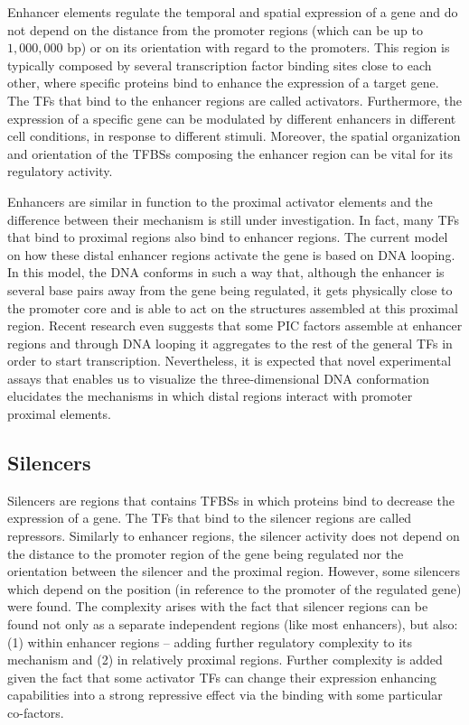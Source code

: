 Enhancer elements regulate the temporal and spatial expression of a gene and do not depend on the distance from the promoter regions (which can be up to \approxy$1,000,000$ bp) or on its orientation with regard to the promoters. This region is typically composed by several transcription factor binding sites close to each other, where specific proteins bind to enhance the expression of a target gene. The TFs that bind to the enhancer regions are called activators. Furthermore, the expression of a specific gene can be modulated by different enhancers in different cell conditions, in response to different stimuli. Moreover, the spatial organization and orientation of the TFBSs composing the enhancer region can be vital for its regulatory activity.

Enhancers are similar in function to the proximal activator elements and the difference between their mechanism is still under investigation. In fact, many TFs that bind to proximal regions also bind to enhancer regions. The current model on how these distal enhancer regions activate the gene is based on DNA looping. In this model, the DNA conforms in such a way that, although the enhancer is several base pairs away from the gene being regulated, it gets physically close to the promoter core and is able to act on the structures assembled at this proximal region. Recent research even suggests that some PIC factors assemble at enhancer regions and through DNA looping it aggregates to the rest of the general TFs in order to start transcription. Nevertheless, it is expected that novel experimental assays that enables us to visualize the three-dimensional DNA conformation elucidates the mechanisms in which distal regions interact with promoter proximal elements.

\subsection{Silencers}
\label{sec:silencers}

Silencers are regions that contains TFBSs in which proteins bind to decrease the expression of a gene. The TFs that bind to the silencer regions are called repressors. Similarly to enhancer regions, the silencer activity does not depend on the distance to the promoter region of the gene being regulated nor the orientation between the silencer and the proximal region. However, some silencers which depend on the position (in reference to the promoter of the regulated gene) were found. The complexity arises with the fact that silencer regions can be found not only as a separate independent regions (like most enhancers), but also: (1) within enhancer regions -- adding further regulatory complexity to its mechanism and (2) in relatively proximal regions. Further complexity is added given the fact that some activator TFs can change their expression enhancing capabilities into a strong repressive effect via the binding with some particular co-factors.  

